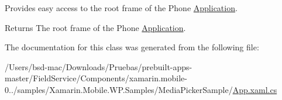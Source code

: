 Provides easy access to the root frame of the Phone \hyperlink{class_media_picker_sample_1_1_application}{Application}. 

\begin{DoxyReturn}{Returns}
The root frame of the Phone \hyperlink{class_media_picker_sample_1_1_application}{Application}.
\end{DoxyReturn}


The documentation for this class was generated from the following file\+:\begin{DoxyCompactItemize}
\item 
/\+Users/bsd-\/mac/\+Downloads/\+Pruebas/prebuilt-\/apps-\/master/\+Field\+Service/\+Components/xamarin.\+mobile-\/0../samples/\+Xamarin.\+Mobile.\+W\+P.\+Samples/\+Media\+Picker\+Sample/\hyperlink{_components_2xamarin_8mobile-0_86_81_2samples_2_xamarin_8_mobile_8_w_p_8_samples_2_media_picker_sample_2_app_8xaml_8cs}{App.\+xaml.\+cs}\end{DoxyCompactItemize}
